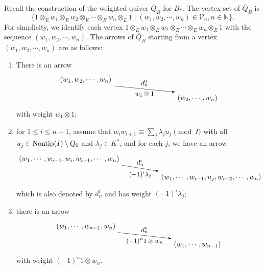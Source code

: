 \documentclass[10pt, reqno]{amsart}
\theoremstyle{definition}
\theoremstyle{remark}
\numberwithin{equation}{section}
\begin{document}
Recall the construction of  the weighted quiver \(\overline{Q}_B\) for $B_*$. The vertex set of \(\overline{Q}_B\) is 
$$\{1 \otimes_E w_1 \otimes_E w_2 \otimes_E \cdots \otimes_E w_n \otimes_E 1\mid (w_1, w_2, \cdots, w_n)\in \mathcal{V}_n, n\in \mathbb{N}\}.$$
 For simplicity, we identify each vertex $1 \otimes_E w_1 \otimes_E w_2 \otimes_E \cdots \otimes_E w_n \otimes_E 1$ with the sequence \((w_1, w_2, \cdots, w_n)\).
 The arrows of \(\overline{Q}_B\) starting from a vertex \((w_1, w_2, \cdots, w_n)\)  are as follows: 
    \begin{enumerate}
        \item There is an arrow 
\[\begin{tikzpicture}[>=Stealth, baseline=(current bounding box.center)]
    \node (top) at (0, 0.4) {$(w_1, w_2, \cdots, w_n)$};
    \node (bot) at (5.5, -0.5) {$(w_2, \cdots, w_n)$};
    \draw[->] (top.south east) -- (bot.north west) 
        node[midway, above, font=\small, yshift=0pt] {$d_n^0$}
        node[midway, below, font=\small, yshift=-0pt] {$w_1 \otimes 1$};
\end{tikzpicture}\]
with weight $w_1 \otimes 1$;

         \item for $1 \le i \le n-1$, assume that $w_i w_{i+1} \equiv \sum_j \lambda_j u_j \pmod{I}$ with all $u_j \in \mathrm{Nontip}(I)\setminus Q_0$ and $\lambda_j \in K^*$, and for each \(j\), we have an arrow 
\[\begin{tikzpicture}[>=Stealth, baseline=(current bounding box.center)]
    \node (top) at (0, 0.4) {$(w_1, \cdots, w_{i-1}, w_i, w_{i+1}, \cdots, w_n)$};
    \node (bot) at (7, -0.5) {$(w_1, \cdots, w_{i-1}, u_j, w_{i+2}, \cdots, w_n)$};
    \draw[->] (top.south east) -- (bot.north west) 
        node[midway, above, font=\small, yshift=0pt] {$d_n^i$}
        node[midway, below, font=\small, yshift=-0pt] {$(-1)^i\lambda_j$};
\end{tikzpicture}\]
which  is also denoted by \(d_n^i\) and has weight \((-1)^i\lambda_j\);

        \item there is an arrow
\[\begin{tikzpicture}[>=Stealth, baseline=(current bounding box.center)]
    \node (top) at (0, 0.4) {$(w_1, \cdots, w_{n-1}, w_n)$};
    \node (bot) at (5.5, -0.5) {$(w_1, \cdots, w_{n-1})$};
    \draw[->] (top.south east) -- (bot.north west) 
        node[midway, above, font=\small, yshift=0pt] {$d_n^n$}
        node[midway, below, font=\small, yshift=-0pt] {$(-1)^n 1 \otimes w_n$};
\end{tikzpicture}\]
with weight \((-1)^n 1 \otimes w_n\).
    \end{enumerate} 
\end{document}
